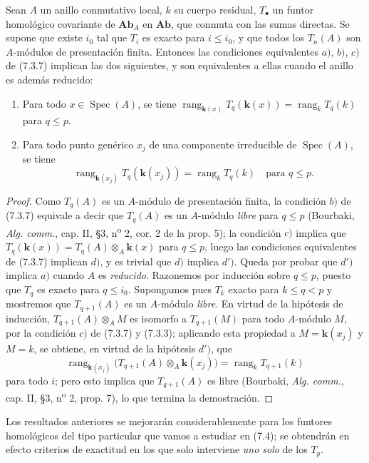 \begin{proposition}[7.3.11]
Sean $A$ un anillo conmutativo local, $k$ su cuerpo residual, $T_\bullet$ un
funtor homológico covariante de $\boldsymbol{Ab}_A$ en $\boldsymbol{Ab}$,
que conmuta con las sumas directas. Se supone que existe $i_0$ tal que $T_i$ es
exacto para $i\leq i_0$, y que todos los $T_n(A)$ son $A$-módulos de
presentación finita. Entonces las condiciones equivalentes $a)$, $b)$, $c)$ de
\textup{(7.3.7)} implican las dos siguientes, y son equivalentes a ellas cuando
el anillo es además reducido:
\begin{enumerate}
  \item[d)] Para todo $x\in\operatorname{Spec}(A)$, se tiene
    $\operatorname{rang}_{\mathbf{k}(x)}T_q(\boldsymbol{k}(x))=\operatorname{rang}_kT_q(k)$
    para $q\leq p$.
  \item[$d'$)] Para todo punto genérico $x_j$ de una componente irreducible
    de $\operatorname{Spec}(A)$, se tiene
    \[
      \operatorname{rang}_{\mathbf{k}(x_j)}T_q(\boldsymbol{k}(x_j))
      =
      \operatorname{rang}_kT_q(k)
      \quad\text{para }q\leq p.
    \]
\end{enumerate}
\end{proposition}

\begin{proof}
Como $T_q(A)$ es un $A$-módulo de presentación finita, la condición $b)$ de
(7.3.7) equivale a decir que $T_q(A)$ es un $A$-módulo \emph{libre} para $q\leq p$
(Bourbaki, \emph{Alg. comm.}, cap. II, \S 3, n\textsuperscript{o} 2, cor. 2
de la prop. 5); la condición $c)$ implica que
$T_q(\boldsymbol{k}(x))=T_q(A)\otimes_A\boldsymbol{k}(x)$ para $q\leq p$,
luego las condiciones equivalentes de (7.3.7) implican $d)$, y es trivial
que $d)$ implica $d')$. Queda por probar que $d')$ implica $a)$ cuando $A$
es \emph{reducido}. Razonemos por inducción sobre $q\leq p$, puesto que $T_q$ es exacto
para $q\leq i_0$. Supongamos pues $T_k$ exacto para $k\leq q<p$ y mostremos que
$T_{q+1}(A)$ es un $A$-módulo \emph{libre}. En virtud de la hipótesis de inducción,
$T_{q+1}(A)\otimes_A M$ es isomorfo a $T_{q+1}(M)$ para todo $A$-módulo $M$,
por la condición $c)$ de (7.3.7) y (7.3.3); aplicando esta propiedad a
$M=\boldsymbol{k}(x_j)$ y $M=k$, se obtiene, en virtud de la hipótesis $d')$, que
\[
  \operatorname{rang}_{\mathbf{k}(x_j)}
  \bigl(T_{q+1}(A)\otimes_A\boldsymbol{k}(x_j)\bigr)
  =
  \operatorname{rang}_kT_{q+1}(k)
\]
para todo $i$; pero esto implica que $T_{q+1}(A)$ es libre (Bourbaki,
\emph{Alg. comm.}, cap. II, \S 3, n\textsuperscript{o} 2, prop. 7), lo que
termina la demostración.
\end{proof}

Los resultados anteriores se mejorarán considerablemente para los funtores
homológicos del tipo particular que vamos a estudiar en (7.4); se
obtendrán en efecto criterios de exactitud en los que solo interviene \emph{uno solo}
de los $T_p$.

